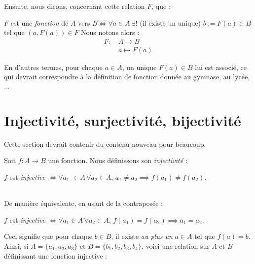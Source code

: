 Ensuite, nous dirons, concernant cette relation $F$, que :
\begin{boxdef}
$F$ est une \textit{fonction} de $A$ vers $B \iff \forall a \in A\ \exists!$ (il existe un unique) $b := F(a) \in B$ tel que $(a, F(a)) \in F$
Nous notons alors :
\begin{align*}
    F: \ &A \to B\\
    &a \mapsto F(a)
\end{align*}
\end{boxdef}
En d'autres termes, pour chaque $a \in A$, un unique $F(a) \in B$ lui est associé, ce qui devrait correspondre à la définition de fonction donnée au gymnase, au lycée, ...

\section{Injectivité, surjectivité, bijectivité}
\noindent Cette section devrait contenir du contenu nouveau pour beaucoup. \\

\begin{boxdef}
Soit $f: A \to B$ une fonction. Nous définissons son \textit{injectivité} : \\
\begin{center}
    $f$ est \textit{injective} $\iff \forall a_1$ $\in A \, \forall a_2 \in A$, $a_1 \neq a_2 \implies f(a_1) \neq f(a_2)$.
\end{center}
\, \\
De manière équivalente, en usant de la contraposée :\\
\begin{center}
    $f$ est \textit{injective} $\iff \forall a_1 \in A \, \forall a_2 \in A$, $f(a_1) = f(a_2) \implies a_1 = a_2$.
\end{center}
\end{boxdef}

Ceci signifie que pour chaque $b \in B$, il existe \textit{au plus un} $a \in A$ tel que $f(a) = b$. Ainsi, si $A = \{a_1, a_2, a_3\}$ et $B = \{b_1, b_2, b_3, b_4\}$, voici une relation sur $A$ et $B$ définissant une fonction injective :

\begin{center}
\end{center}

